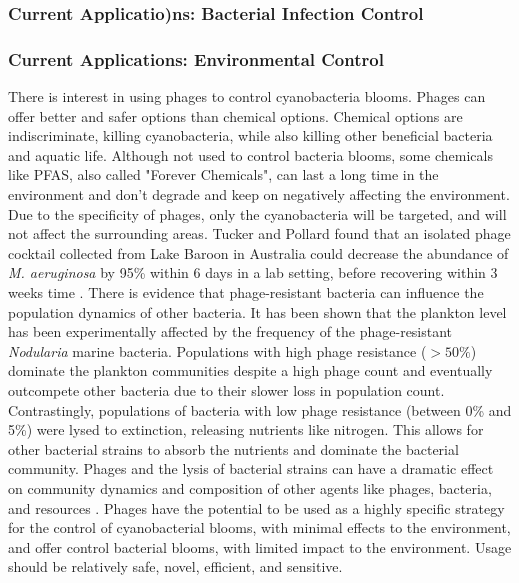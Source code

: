 \subsubsection{Current Applicatio)ns: Bacterial Infection Control}


\subsubsection{Current Applications: Environmental Control}
There is interest in using phages to control cyanobacteria blooms. Phages can offer better and safer options than chemical options. Chemical options are indiscriminate, killing cyanobacteria, while also killing other beneficial bacteria and aquatic life. Although not used to control bacteria blooms, some chemicals like PFAS, also called "Forever Chemicals", can last a long time in the environment and don't degrade and keep on negatively affecting the environment. Due to the specificity of phages, only the cyanobacteria will be targeted, and will not affect the surrounding areas. Tucker and Pollard found that an isolated phage cocktail collected from Lake Baroon in Australia could decrease the abundance of \textit{M. aeruginosa} by 95\% within 6 days in a lab setting, before recovering within 3 weeks time \cite{tuckerIdentificationCyanophageMaLBP2005}. \newline 
There is evidence that phage-resistant bacteria can influence the population dynamics of other bacteria. It has been shown that the plankton level has been experimentally affected by the frequency of the phage-resistant \textit{Nodularia} marine bacteria. Populations with high phage resistance ($>50\%$) dominate the plankton communities despite a high phage count and eventually outcompete other bacteria due to their slower loss in population count. Contrastingly, populations of bacteria with low phage resistance (between 0\% and 5\%) were lysed to extinction, releasing nutrients like nitrogen. This allows for other bacterial strains to absorb the nutrients and dominate the bacterial community. Phages and the lysis of bacterial strains can have a dramatic effect on community dynamics and composition of other agents like phages, bacteria, and resources \cite{colomaFrequencyVirusresistantHosts2019}. Phages have the potential to be used as a highly specific strategy for the control of cyanobacterial blooms, with minimal effects to the environment, and offer control bacterial blooms, with limited impact to the environment. Usage should be relatively safe, novel, efficient, and sensitive. \newline 


